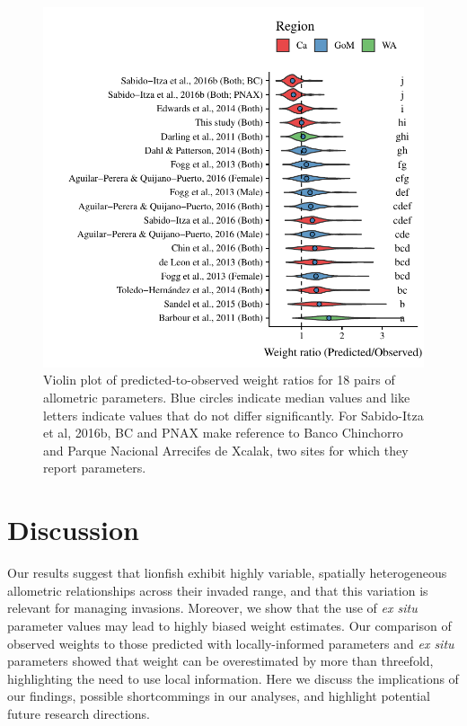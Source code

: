 \documentclass[fleqn,10pt,lineno]{wlpeerj} %
\begin{document}
\begin{figure}
\centering
\includegraphics{Manuscript_files/figure-latex/pred_obs-1.pdf}
\caption{\label{fig:bio_ratio}Violin plot of predicted-to-observed
weight ratios for 18 pairs of allometric parameters. Blue circles
indicate median values and like letters indicate values that do not
differ significantly. For Sabido-Itza et al, 2016b, BC and PNAX make
reference to Banco Chinchorro and Parque Nacional Arrecifes de Xcalak,
two sites for which they report parameters.}
\end{figure}

\clearpage

\section*{Discussion}

Our results suggest that lionfish exhibit highly variable, spatially
heterogeneous allometric relationships across their invaded range, and
that this variation is relevant for managing invasions. Moreover, we
show that the use of \emph{ex situ} parameter values may lead to highly
biased weight estimates. Our comparison of observed weights to those
predicted with locally-informed parameters and \emph{ex situ} parameters
showed that weight can be overestimated by more than threefold,
highlighting the need to use local information. Here we discuss the
implications of our findings, possible shortcommings in our analyses,
and highlight potential future research directions.
\end{document}
